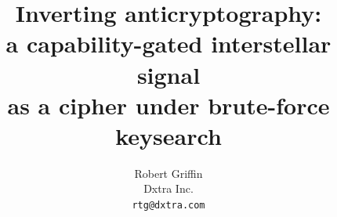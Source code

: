 %
\documentclass[11pt,a4paper]{article}

\usepackage[T1]{fontenc}
\usepackage[utf8]{inputenc}
\usepackage{lmodern}
\usepackage{amsmath,amssymb,amsthm}
\usepackage{booktabs}
\usepackage{array}
\usepackage[margin=1in]{geometry}
\usepackage[hidelinks]{hyperref}
\usepackage{microtype}

\newtheorem{proposition}{Proposition}

\title{Inverting anticryptography:\\
a capability-gated interstellar signal\\
as a cipher under brute-force keysearch}
\author{Robert Griffin\\
\small Dxtra Inc.\\
\small \texttt{rtg@dxtra.com}}
\date{}


\maketitle

